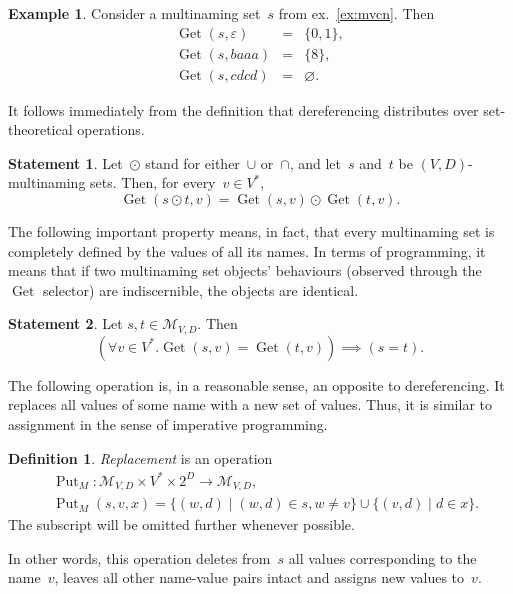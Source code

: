 \documentclass{article}
\theoremstyle{definition}
\newtheorem{Df}{Definition}
\newtheorem{St}{Statement}
\newtheorem{Ex}{Example}
\newcommand{\setcharmvcn}{M}
\newcommand{\setsymbol}[3]{\mathcal{#1}_{#2,#3}}
\newcommand{\setmvcn}[2]{\setsymbol{\setcharmvcn}{#1}{#2}}
\newcommand{\deref}{\operatorname{Get}}
\newcommand{\putval}{\operatorname{Put}}
\begin{document}
\begin{Ex}\label{ex:mvcn-dereferencing}
Consider a multinaming set~$s$ from ex.~\ref{ex:mvcn}. Then
\begin{eqnarray*}
  \deref(s, \varepsilon) & = & \{ 0, 1 \}, \\
  \deref(s, baaa)        & = & \{ 8 \}, \\
  \deref(s, cdcd)        & = & \varnothing .
\end{eqnarray*}

\end{Ex}

It follows immediately from the definition that dereferencing distributes
over set-theore\-tical operations.
\begin{St}\label{st:mvcn-deref-distributivity}
Let~$\odot$ stand for either~$\cup$ or~$\cap$, and let~$s$ and~$t$ be
$(V,D)$-multinaming sets. Then, for every~$v\in V^\ast$,
\[
  \deref(s\odot t, v) = \deref(s, v) \odot \deref(t, v) .
\]
\end{St}

The following important property means, in fact, that every multinaming set is completely
defined by the values of all its names.  In terms of programming, it means that
if two multinaming set objects' behaviours (observed through the $\deref$ selector) are
indiscernible, the objects are identical.
\begin{St}\label{st:mvcn-deref-equality}
Let $s, t \in \setmvcn{V}{D}$. Then
\[
  (\forall v\in V^\ast . \deref(s,v) = \deref(t,v)) \implies (s = t) .
\]
\end{St}

The following operation is, in a reasonable sense, an opposite to
dereferencing.  It replaces all values of some name with a new set of values.
Thus, it is similar to assignment in the sense of imperative programming.
\begin{Df}\label{df:mvcn-replace}
\emph{Replacement} is an operation
\begin{eqnarray*}
 & \putval_\setcharmvcn :
    \setmvcn{V}{D} \times V^\ast \times 2^D \to \setmvcn{V}{D}, \\
 & \putval_\setcharmvcn(s, v, x) =
      \{ (w, d) \mid (w, d) \in s, w \neq v \} \cup
      \{ (v, d) \mid d \in x \} .
\end{eqnarray*}
The subscript will be omitted further whenever possible.
\end{Df}
In other words, this operation deletes from~$s$ all values corresponding to
the name~$v$, leaves all other name-value pairs intact and assigns new values
to~$v$.
\end{document}
